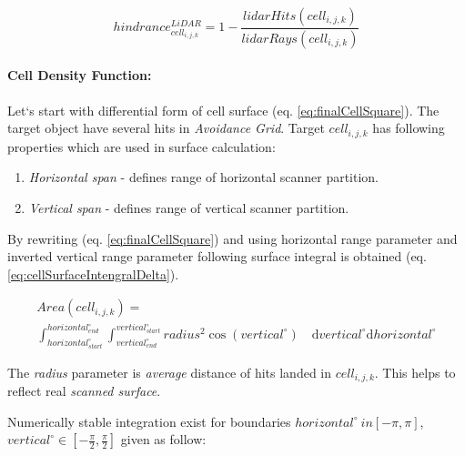 \begin{equation}\label{eq:probabilityOfVisibilityHindrance}
    hindrance^{LiDAR}_{cell_{i,j,k}}=1-\frac{lidar Hits(cell_{i,j,k})}{lidar Rays(cell_{i,j,k})}
\end{equation}

\paragraph{Cell Density Function:}  Let`s start with differential form of cell surface (eq. \ref{eq:finalCellSquare}). The target object have several hits in \emph{Avoidance Grid}. Target $cell_{i,j,k}$ has following properties which are used in surface calculation:
\begin{enumerate}
    \item \textit{Horizontal span} - defines range of horizontal scanner partition.
    \item \textit{Vertical span} - defines range of vertical scanner partition.
\end{enumerate}

\newpage\noindent By rewriting (eq. \ref{eq:finalCellSquare}) and using horizontal range parameter and inverted vertical range parameter following surface integral is obtained (eq. \ref{eq:cellSurfaceIntengralDelta}).

\begin{multline}\label{eq:cellSurfaceIntengralDelta}
    Area(cell_{i,j,k}) =\\ \int_{horizontal_{start}^\circ}^{horizontal_{end}^\circ}\int_{vertical_{end}^\circ}^{vertical_{start}^\circ} radius^2 \cos(vertical^\circ) \quad \text{d} vertical^
    \circ\text{d} horizontal^\circ
\end{multline}

\begin{note}
    The \emph{radius} parameter is \emph{average} distance of hits landed in $cell_{i,j,k}$. This helps to reflect real \emph{scanned surface}.
\end{note}

Numerically stable integration exist for boundaries $horizontal^\circ \ in [-\pi,\pi]$, $vertical^\circ \in [-\frac{\pi}{2},\frac{\pi}{2}]$ given as follow:

